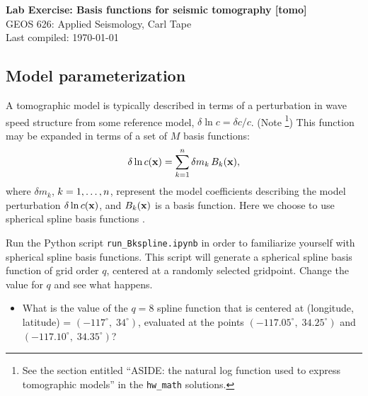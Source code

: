 \documentclass[11pt,titlepage,fleqn]{article}
\begin{document}

\begin{spacing}{1.2}
\centering
{\large \bf Lab Exercise: Basis functions for seismic tomography [tomo]} \\
GEOS 626: Applied Seismology, Carl Tape \\
Last compiled: \today
\end{spacing}


\subsection*{Model parameterization}

A tomographic model is typically described in terms of a perturbation in wave speed structure from some reference model, \ie $\delta\ln c = \delta c/c$.
(Note \footnote{See the section entitled ``ASIDE: the natural log function used to express tomographic models'' in the {\tt hw\_math} solutions.})
This function may be expanded in terms of a set of $M$ basis functions:
%
\begin{equation}
\delta\ln c(\mbox{${\bf x}$})=\sum_{k=1}^{n} \delta m_k\,B_k(\mbox{${\bf x}$}),
\label{dlnv}
\end{equation}
%
where $\delta m_k$, $k=1,\ldots,n$, represent the model coefficients describing the model perturbation $\delta\ln c(\mbox{${\bf x}$})$, and $B_k(\mbox{${\bf x}$})$ is a basis function. Here we choose to use spherical spline basis functions \citep{WangDahlen1995spline,Wang1998}.

Run the Python script \verb+run_Bkspline.ipynb+ in order to familiarize yourself with spherical spline basis functions. This script will generate a spherical spline basis function of grid order $q$, centered at a randomly selected gridpoint. Change the value for $q$ and see what happens. 

\begin{itemize}
\item What is the value of the $q=8$ spline function that is centered at (longitude, latitude) = $(-117^\circ,\;34^\circ)$, evaluated at the points $(-117.05^\circ,\;34.25^\circ)$ and $(-117.10^\circ,\;34.35^\circ)$?
\end{itemize}

\end{document}
